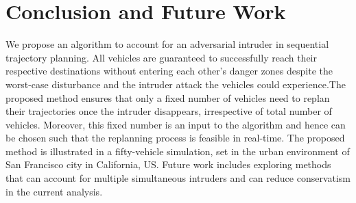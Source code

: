 \section{Conclusion and Future Work}
We propose an algorithm to account for an adversarial intruder in sequential trajectory planning. All vehicles are guaranteed to successfully reach their respective destinations without entering each other's danger zones despite the worst-case disturbance and the intruder attack the vehicles could experience.The proposed method ensures that only a fixed number of vehicles need to replan their trajectories once the intruder disappears, irrespective of total number of vehicles. Moreover, this fixed number is an input to the algorithm and hence can be chosen such that the replanning process is feasible in real-time. The proposed method is illustrated in a fifty-vehicle simulation, set in the urban environment of San Francisco city in California, US. Future work includes exploring methods that can account for multiple simultaneous intruders and can reduce conservatism in the current analysis.